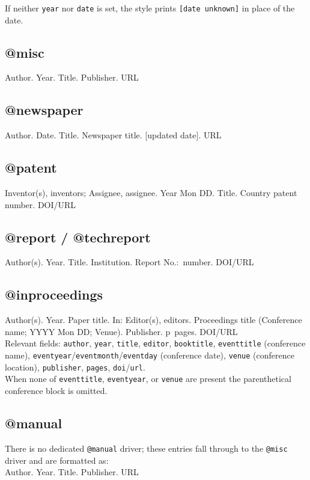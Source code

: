\documentclass[11pt]{article}
\begin{document}
If neither \texttt{year} nor \texttt{date} is set, the style prints \texttt{[date unknown]} in place of the date.

\subsection{@misc}
Author. Year. Title. Publisher. URL

\subsection{@newspaper}
Author. Date. Title. Newspaper title. [updated date]. URL

\subsection{@patent}
Inventor(s), inventors; Assignee, assignee. Year Mon DD. Title. Country patent number. DOI/URL

\subsection{@report / @techreport}
Author(s). Year. Title. Institution. Report No.:~number. DOI/URL

\subsection{@inproceedings}
Author(s). Year. Paper title. In: Editor(s), editors. Proceedings title (Conference name; YYYY Mon DD; Venue). Publisher. p~pages. DOI/URL\\[4pt]
Relevant fields: \texttt{author}, \texttt{year}, \texttt{title}, \texttt{editor}, \texttt{booktitle},
\texttt{eventtitle} (conference name), \texttt{eventyear}/\texttt{eventmonth}/\texttt{eventday} (conference date),
\texttt{venue} (conference location), \texttt{publisher}, \texttt{pages}, \texttt{doi}/\texttt{url}.\\[4pt]
When none of \texttt{eventtitle}, \texttt{eventyear}, or \texttt{venue} are present the
parenthetical conference block is omitted.

\subsection{@manual}
There is no dedicated \texttt{@manual} driver; these entries fall through to the \texttt{@misc} driver and are formatted as:\\
Author. Year. Title. Publisher. URL
\end{document}
